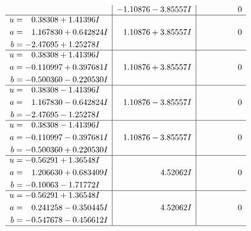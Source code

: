\documentclass[1p]{elsarticle_modified}
\theoremstyle{definition}
\begin{document}
$$\begin{array}{c|c|c}
 & -1.10876 - 3.85557 I & \phantom{-0.000000 } 0 \\ \hline\begin{aligned}
u &= \phantom{-}0.38308 + 1.41396 I \\
a &= \phantom{-}1.167830 + 0.642824 I \\
b &= -2.47695 + 1.25278 I\end{aligned}
 & \phantom{-}1.10876 + 3.85557 I & \phantom{-0.000000 } 0 \\ \hline\begin{aligned}
u &= \phantom{-}0.38308 + 1.41396 I \\
a &= -0.110997 + 0.397681 I \\
b &= -0.500360 - 0.220530 I\end{aligned}
 & \phantom{-}1.10876 + 3.85557 I & \phantom{-0.000000 } 0 \\ \hline\begin{aligned}
u &= \phantom{-}0.38308 - 1.41396 I \\
a &= \phantom{-}1.167830 - 0.642824 I \\
b &= -2.47695 - 1.25278 I\end{aligned}
 & \phantom{-}1.10876 - 3.85557 I & \phantom{-0.000000 } 0 \\ \hline\begin{aligned}
u &= \phantom{-}0.38308 - 1.41396 I \\
a &= -0.110997 - 0.397681 I \\
b &= -0.500360 + 0.220530 I\end{aligned}
 & \phantom{-}1.10876 - 3.85557 I & \phantom{-0.000000 } 0 \\ \hline\begin{aligned}
u &= -0.56291 + 1.36548 I \\
a &= \phantom{-}1.206630 + 0.683409 I \\
b &= -0.10063 - 1.71772 I\end{aligned}
 & \phantom{-0.000000 -}4.52062 I & \phantom{-0.000000 } 0 \\ \hline\begin{aligned}
u &= -0.56291 + 1.36548 I \\
a &= \phantom{-}0.241258 - 0.350445 I \\
b &= -0.547678 - 0.456612 I\end{aligned}
 & \phantom{-0.000000 -}4.52062 I & \phantom{-0.000000 } 0\\
 \hline 
 \end{array}$$\newpage$$\begin{array}{c|c|c}  

\end{array}$$
\end{document}
